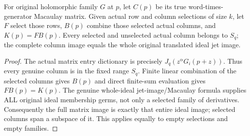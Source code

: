 \begin{lemma}
\label{hir:actual-selected-columns-entire-ideal-image}
\leanok
{}
For original holomorphic family $G$ at $p$, let $C(p)$ be its true word-times-
generator Macaulay matrix. Given actual row and column selections of size $k$,
let $F$ select those rows, $B(p)$ combine those selected actual columns, and
$K(p)=FB(p)$. Every selected and unselected actual column belongs to $S_q$;
the complete column image equals the whole original translated ideal jet image.
\end{lemma}
\begin{proof}
The actual matrix entry dictionary is precisely $J_q(z^\alpha G_i(p+z))$.
Thus every genuine column is in the fixed range $S_q$. Finite linear combination
of the selected columns gives $B(p)$ and direct finite-sum evaluation gives
$FB(p)=K(p)$. The genuine whole-ideal jet-image/Macaulay formula supplies ALL
original ideal membership germs, not only a selected family of derivatives.
Consequently the full matrix image is exactly that entire ideal image; selected
columns span a subspace of it. This applies equally to empty selections and
empty families.
\end{proof}

